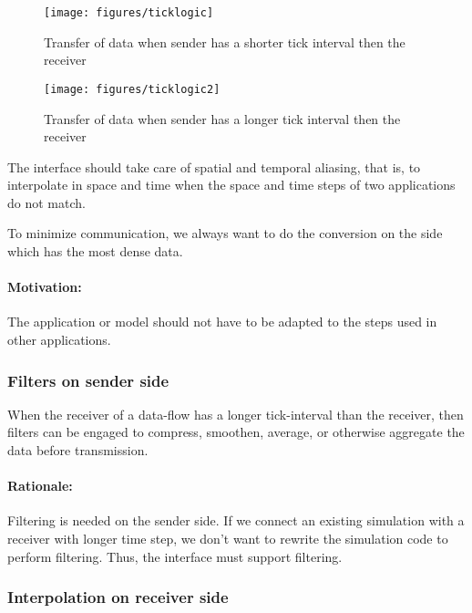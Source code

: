 \documentclass[a4paper]{report}
\newenvironment{rationale}%
{\par\paragraph{Rationale:}}%
{\par}
\begin{document}
\begin{figure}
  \begin{center}
    \begin{minipage}{0.45\textwidth}
      \texttt{[image: figures/ticklogic]}
      \caption{Transfer of data when sender has a shorter
        tick interval then the receiver}
    \end{minipage}
    \hfill
    \begin{minipage}{0.45\textwidth}
      \texttt{[image: figures/ticklogic2]}
      \caption{Transfer of data when sender has a longer
        tick interval then the receiver}
    \end{minipage}
  \end{center}
\end{figure}

The interface should take care of spatial and temporal aliasing, that
is, to interpolate in space and time when the space and time steps of
two applications do not match.

To minimize communication, we always want to do the conversion on the
side which has the most dense data.

\paragraph{Motivation:} The application or model should not have to be
adapted to the steps used in other applications.


\subsubsection{Filters on sender side}

When the receiver of a data-flow has a longer tick-interval than the
receiver, then filters can be engaged to compress, smoothen, average,
or otherwise aggregate the data before transmission.

\begin{rationale}
  Filtering is needed on the sender side.  If we connect an existing
  simulation with a receiver with longer time step, we don't want to
  rewrite the simulation code to perform filtering.  Thus, the
  interface must support filtering.
\end{rationale}


\subsubsection{Interpolation on receiver side}
\end{document}
